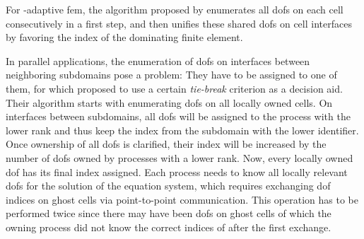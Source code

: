 For \hp-adaptive \gls{fem}, the algorithm proposed by \textcite[Sec.~4.2]{bangerth2009} enumerates all \glspl{dof} on each cell consecutively in a first step, and then unifies these shared \glspl{dof} on cell interfaces by favoring the index of the dominating finite element.





In parallel applications, the enumeration of \glspl{dof} on interfaces between neighboring subdomains pose a problem: They have to be assigned to one of them, for which \textcite[Sec.~3.1]{bangerth2012} proposed to use a certain \textit{tie-break} criterion as a decision aid. Their algorithm starts with enumerating \glspl{dof} on all locally owned cells. On interfaces between subdomains, all \glspl{dof} will be assigned to the process with the lower rank and thus keep the index from the subdomain with the lower identifier. Once ownership of all \glspl{dof} is clarified, their index will be increased by the number of \glspl{dof} owned by processes with a lower rank. Now, every locally owned \gls{dof} has its final index assigned. Each process needs to know all locally relevant \glspl{dof} for the solution of the equation system, which requires exchanging \gls{dof} indices on ghost cells via point-to-point communication. This operation has to be performed twice since there may have been \glspl{dof} on ghost cells of which the owning process did not know the correct indices of after the first exchange.


